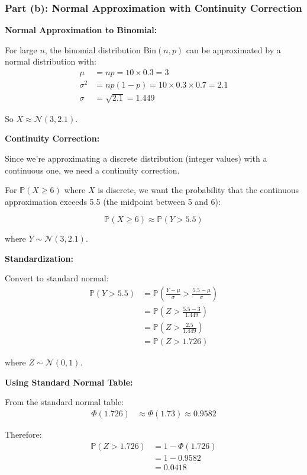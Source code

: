 \documentclass[12pt]{article}
\begin{document}
\subsubsection{Part (b): Normal Approximation with Continuity Correction}

\begin{solution}
\textbf{Normal Approximation to Binomial:}

For large \(n\), the binomial distribution \(\text{Bin}(n, p)\) can be approximated by a normal distribution with:
\begin{align*}
\mu &= np = 10 \times 0.3 = 3 \\
\sigma^2 &= np(1-p) = 10 \times 0.3 \times 0.7 = 2.1 \\
\sigma &= \sqrt{2.1} = 1.449
\end{align*}

So \(X \approx \mathcal{N}(3, 2.1)\).

\textbf{Continuity Correction:}

Since we're approximating a discrete distribution (integer values) with a continuous one, we need a continuity correction.

For \(\mathbb{P}(X \geq 6)\) where \(X\) is discrete, we want the probability that the continuous approximation exceeds 5.5 (the midpoint between 5 and 6):

\[
\mathbb{P}(X \geq 6) \approx \mathbb{P}(Y > 5.5)
\]

where \(Y \sim \mathcal{N}(3, 2.1)\).

\textbf{Standardization:}

Convert to standard normal:
\begin{align*}
\mathbb{P}(Y > 5.5) &= \mathbb{P}\left(\frac{Y - \mu}{\sigma} > \frac{5.5 - \mu}{\sigma}\right) \\
&= \mathbb{P}\left(Z > \frac{5.5 - 3}{1.449}\right) \\
&= \mathbb{P}\left(Z > \frac{2.5}{1.449}\right) \\
&= \mathbb{P}(Z > 1.726)
\end{align*}

where \(Z \sim \mathcal{N}(0, 1)\).

\textbf{Using Standard Normal Table:}

From the standard normal table:
\begin{align*}
\Phi(1.726) &\approx \Phi(1.73) \approx 0.9582
\end{align*}

Therefore:
\begin{align*}
\mathbb{P}(Z > 1.726) &= 1 - \Phi(1.726) \\
&= 1 - 0.9582 \\
&= 0.0418
\end{align*}


\end{solution}
\end{document}
